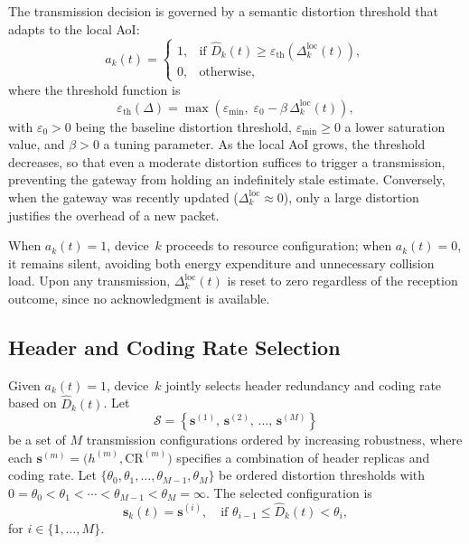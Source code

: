 \documentclass[lettersize,journal]{IEEEtran}
\begin{document}
The transmission decision is governed by a semantic distortion threshold that adapts to the local \ac{AoI}:
\begin{equation}
    a_k(t) =
    \begin{cases}
        1, & \text{if } \hat{D}_k(t) \geq \varepsilon_{\mathrm{th}}\!\left(\Delta_k^{\mathrm{loc}}(t)\right), \\
        0, & \text{otherwise},
    \end{cases}
    \label{eq:trigger}
\end{equation}
where the threshold function is
\begin{equation}
    \varepsilon_{\mathrm{th}}(\Delta) =
      \max\!\left(\varepsilon_{\min},\; \varepsilon_0 - \beta\,\Delta_k^{\mathrm{loc}}(t)\right),
    \label{eq:dynamic_threshold}
\end{equation}
with $\varepsilon_0 > 0$ being the baseline distortion threshold, $\varepsilon_{\min} \geq 0$ a lower saturation value, and $\beta > 0$ a tuning parameter. As the local \ac{AoI} grows, the threshold decreases, so that even a moderate distortion suffices to trigger a transmission, preventing the gateway from holding an indefinitely stale estimate. Conversely, when the gateway was recently updated ($\Delta_k^{\mathrm{loc}} \approx 0$), only a large distortion justifies the overhead of a new packet.

When $a_k(t) = 1$, device~$k$ proceeds to resource configuration; when $a_k(t) = 0$, it remains silent, avoiding both energy expenditure and unnecessary collision load. Upon any transmission, $\Delta_k^{\mathrm{loc}}(t)$ is reset to zero regardless of the reception outcome, since no acknowledgment is available.

\subsection{Header and Coding Rate Selection}
\label{subsec:header}

Given $a_k(t) = 1$, device~$k$ jointly selects header redundancy and coding rate based on $\hat{D}_k(t)$. Let
\begin{equation}
\mathcal{S} = \left\{ \mathbf{s}^{(1)},\, \mathbf{s}^{(2)},\, \dots,\, \mathbf{s}^{(M)} \right\}
\end{equation}
be a set of $M$ transmission configurations ordered by increasing robustness, where each $\mathbf{s}^{(m)} = \bigl( h^{(m)}, \mathrm{CR}^{(m)} \bigr)$ specifies a combination of header replicas and coding rate. Let $\{ \theta_0, \theta_1, \dots, \theta_{M-1}, \theta_M \}$ be ordered distortion thresholds with $0 = \theta_0 < \theta_1 < \cdots < \theta_{M-1} < \theta_M = \infty$. The selected configuration is
\begin{equation}
    \mathbf{s}_k(t) = \mathbf{s}^{(i)}, \quad \text{if } \theta_{i-1} \le \hat{D}_k(t) < \theta_i,
    \label{eq:semantic_config}
\end{equation}
for $i \in \{1,\dots,M\}$.
\end{document}
